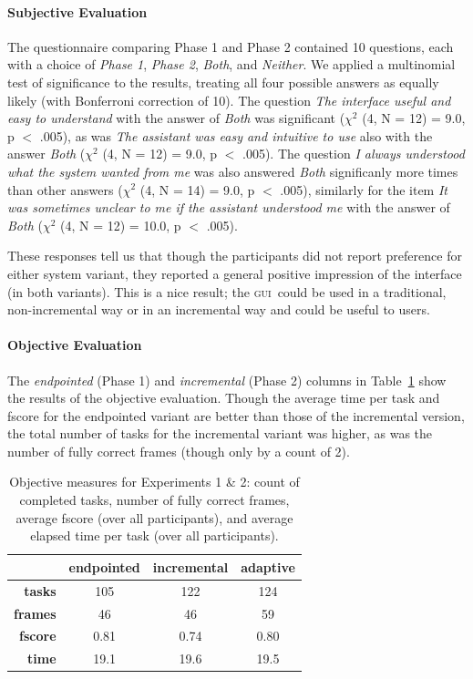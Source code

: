 \documentclass[11pt]{article}
\newcommand{\ui}[0]{\textsc{gui}}
\begin{document}
\paragraph{Subjective Evaluation} The questionnaire comparing Phase 1 and Phase 2 contained 10 questions, each with a choice of \emph{Phase 1}, \emph{Phase 2}, \emph{Both}, and \emph{Neither}. We applied a multinomial test of significance to the results, treating all four possible answers as equally likely (with Bonferroni correction of 10). The question \emph{The interface useful and easy to understand} with the answer of \emph{Both} was significant ($ \chi^2 $ (4, N = 12) = 9.0, p $<$ .005), as was \emph{The assistant was easy and intuitive to use} also with the answer \emph{Both} ($ \chi^2 $ (4, N = 12) = 9.0, p $<$ .005). The question \emph{I always understood what the system wanted from me} was also answered \emph{Both} significanly more times than other answers ($ \chi^2 $ (4, N = 14) = 9.0, p $<$ .005), similarly for the item \emph{It was sometimes unclear to me if the assistant understood me} with the answer of \emph{Both} ($ \chi^2 $ (4, N = 12) = 10.0, p $<$ .005). 

These responses tell us that though the participants did not report preference for either system variant, they reported a general positive impression of the interface (in both variants). This is a nice result; the \ui\ could be used in a traditional, non-incremental way or in an incremental way and could be useful to users. 

\paragraph{Objective Evaluation}  The \emph{endpointed} (Phase 1) and \emph{incremental} (Phase 2) columns in Table~\ref{tab:objscores} show the results of the objective evaluation. Though the average time per task and fscore for the endpointed variant are better than those of the incremental version, the total number of tasks for the incremental variant was higher, as was the number of fully correct frames (though only by a count of 2). 


\begin{table}
 \begin{tabular}{|r|c|c|c|}
\hline
                     & \textbf{endpointed} & \textbf{incremental} & \textbf{adaptive} \\
\hline
\textbf{tasks} & 105 & 122 & 124  \\
\textbf{frames} & 46 & 46 & 59 \\
\textbf{fscore} & 0.81 & 0.74 & 0.80 \\
\textbf{time} & 19.1 & 19.6 & 19.5 \\
 \hline
\end{tabular}
\caption{Objective measures for Experiments 1 \& 2: count of completed tasks, number of fully correct frames, average fscore (over all participants), and average elapsed time per task (over all participants).}
\label{tab:objscores}
\end{table}
\end{document}
